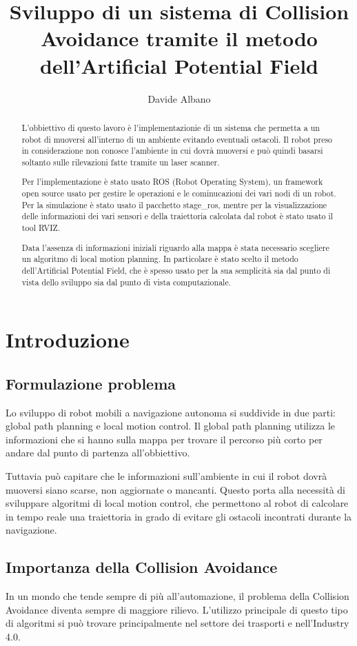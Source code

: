 \documentclass[Lau, binding=0.6cm, oneside]{sapthesis}
\title{Sviluppo di un sistema di Collision Avoidance tramite il metodo dell'Artificial Potential Field}
\author{Davide Albano}
\begin{document}
\maketitle
\begin{abstract}
L'obbiettivo di questo lavoro è l'implementazionie di un sistema che permetta a un robot di muoversi all'interno di un ambiente evitando eventuali ostacoli.
Il robot preso in considerazione non conosce l'ambiente in cui dovrà muoversi e può quindi basarsi soltanto sulle rilevazioni fatte tramite un laser scanner.

Per l'implementazione è stato usato ROS (Robot Operating System), un framework open source usato per gestire le operazioni e le cominucazioni dei vari nodi di un robot.
Per la simulazione è stato usato il pacchetto stage\_ros, mentre per la visualizzazione delle informazioni dei vari sensori e della traiettoria calcolata dal robot è stato usato il tool RVIZ.

Data l'assenza di informazioni iniziali riguardo alla mappa è stata necessario scegliere un algoritmo di local motion planning.
In particolare è stato scelto il metodo dell'Artificial Potential Field, che è spesso usato per la sua semplicità sia dal punto di vista dello sviluppo sia dal punto di vista computazionale.
\end{abstract}
\tableofcontents

\chapter{Introduzione}
\section{Formulazione problema}
Lo sviluppo di robot mobili a navigazione autonoma si suddivide in due parti: global path planning e local motion control.
Il global path planning utilizza le informazioni che si hanno sulla mappa per trovare il percorso più corto per andare dal punto di partenza all'obbiettivo.

Tuttavia può capitare che le informazioni sull'ambiente in cui il robot dovrà muoversi siano scarse, non aggiornate o mancanti.
Questo porta alla necessità di sviluppare algoritmi di local motion control, che permettono al robot di calcolare in tempo reale una traiettoria in grado di evitare gli ostacoli incontrati durante la navigazione.
\cite{fonte1}

\section{Importanza della Collision Avoidance}
In un mondo che tende sempre di più all'automazione, il problema della Collision Avoidance diventa sempre di maggiore rilievo.
L'utilizzo principale di questo tipo di algoritmi si può trovare principalmente nel settore dei trasporti e nell'Industry 4.0.
\end{document}
